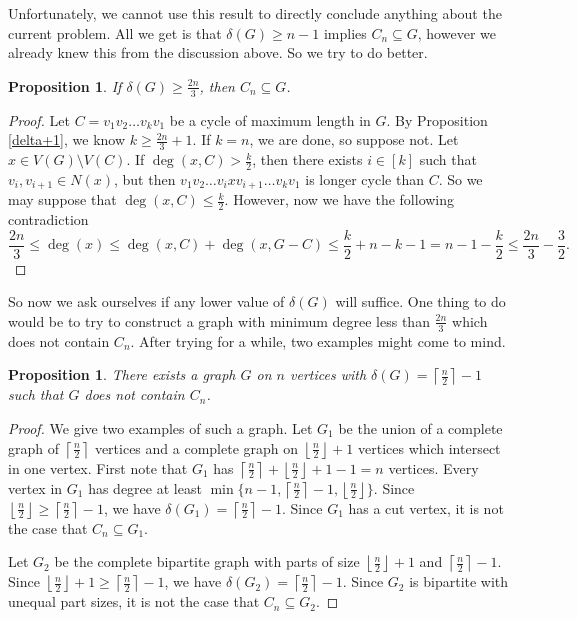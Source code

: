 \documentclass[oneside,12pt]{memoir}
\newtheorem{proposition}[theorem]{Proposition}
\newcommand{\floor}[1]{\left\lfloor#1\right\rfloor}
\newcommand{\ceiling}[1]{\left\lceil#1\right\rceil}
\begin{document}
Unfortunately, we cannot use this result to directly conclude anything
about the current problem.  All we get is that $\delta(G)\geq n-1$
implies $C_n\subseteq G$, however we already knew this from the discussion
above.  So we try to do better.

\begin{proposition}
If $\delta(G)\geq \frac{2n}{3}$, then $C_n\subseteq G$.
\end{proposition}

\begin{proof}
Let $C=v_1v_2\dots v_kv_1$ be a cycle of maximum length in $G$.  By
Proposition \ref{delta+1}, we know $k\geq \frac{2n}{3}+1$.  If $k=n$,
we are done, so suppose not.  Let $x\in V(G)\setminus V(C)$.  If
$\deg(x, C)>\frac{k}{2}$, then there exists $i\in [k]$ such that $v_i,
v_{i+1}\in N(x)$, but then $v_1v_2\dots v_ixv_{i+1}\dots v_kv_1$ is
longer cycle than $C$.  So we may suppose that $\deg(x, C)\leq
\frac{k}{2}$.  However, now we have the following contradiction
$$\frac{2n}{3}\leq \deg(x)\leq \deg(x, C)+\deg(x, G-C)\leq
\frac{k}{2}+n-k-1=n-1-\frac{k}{2}\leq \frac{2n}{3}-\frac{3}{2}.$$
\end{proof}

So now we ask ourselves if any lower value of $\delta(G)$ will
suffice.  One thing to do would be to try to construct a graph with
minimum degree less than $\frac{2n}{3}$ which does not contain $C_n$.
After trying for a while, two examples might come to mind.

\begin{proposition}\label{diracexamples}
There exists a graph $G$ on $n$ vertices with $\delta(G)=\ceiling{\frac{n}{2}}-1$ such that $G$ does not contain $C_n$.
\end{proposition}

\begin{proof}

We give two examples of such a graph.  Let $G_1$ be the union of a complete graph of $\ceiling{\frac{n}{2}}$ vertices and a complete graph on $\floor{\frac{n}{2}}+1$ vertices which intersect in one vertex.  First note that $G_1$ has $\ceiling{\frac{n}{2}}+\floor{\frac{n}{2}}+1-1=n$ vertices.  Every vertex in $G_1$ has degree at least $\min\{n-1, \ceiling{\frac{n}{2}}-1, \floor{\frac{n}{2}}\}$.  Since $\floor{\frac{n}{2}}\geq \ceiling{\frac{n}{2}}-1$, we have $\delta(G_1)=\ceiling{\frac{n}{2}}-1$.  Since $G_1$ has a cut vertex, it is not the case that $C_n\subseteq G_1$.

Let $G_2$ be the complete bipartite graph with parts of size $\floor{\frac{n}{2}}+1$ and $\ceiling{\frac{n}{2}}-1$.  Since $\floor{\frac{n}{2}}+1\geq \ceiling{\frac{n}{2}}-1$, we have $\delta(G_2)=\ceiling{\frac{n}{2}}-1$.  Since $G_2$ is bipartite with unequal part sizes, it is not the case that $C_n\subseteq G_2$.




\end{proof}
\end{document}
